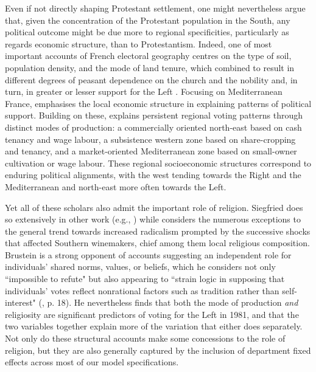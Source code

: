 \documentclass[12pt]{article}
\begin{document}
Even if not directly shaping Protestant settlement, one might nevertheless argue that, given the concentration of the Protestant population in the South, any political outcome might be due more to regional specificities, particularly as regards economic structure, than to Protestantism. Indeed, one of most important accounts of French electoral geography centres on the type of soil, population density, and the mode of land tenure, which combined to result in different degrees of peasant dependence on the church and the nobility and, in turn, in greater or lesser support for the Left \parencite{siegfriedTableauPolitique1964}. Focusing on Mediterranean France, \textcite{loubereRadicalismMediterraneanFrance1974} emphasises the local economic structure in explaining patterns of political support. Building on these, \textcite{brusteinRegionalModeofProductionAnalysis1981a, brusteinSocialOriginsPolitical1988} explains persistent regional voting patterns through distinct modes of production: a commercially oriented north-east based on cash tenancy and wage labour, a subsistence western zone based on share-cropping and tenancy, and a market-oriented Mediterranean zone based on small-owner cultivation or wage labour. These regional socioeconomic structures correspond to enduring political alignments, with the west tending towards the Right and the Mediterranean and north-east more often towards the Left. 

Yet all of these scholars also admit the important role of religion. Siegfried does so extensively in other work (e.g., \cite{siegfriedGeographieElectoraleLArdeche1949}) while \textcite{loubereRadicalismMediterraneanFrance1974} considers the numerous exceptions to the general trend towards increased radicalism prompted by the successive shocks that affected Southern winemakers, chief among them local religious composition. Brustein is a strong opponent of accounts suggesting an independent role for individuals' shared norms, values, or beliefs, which he considers not only ``impossible to refute" but also appearing to ``strain logic in supposing that individuals’ votes reflect nonrational factors such as tradition rather than self-interest" (\cite{brusteinSocialOriginsPolitical1988}, p. 18). He nevertheless finds that both the mode of production \textit{and} religiosity are significant predictors of voting for the Left in 1981, and that the two variables together explain more of the variation that either does separately. Not only do these structural accounts make some concessions to the role of religion, but they are also generally captured by the inclusion of department fixed effects across most of our model specifications.
\end{document}
